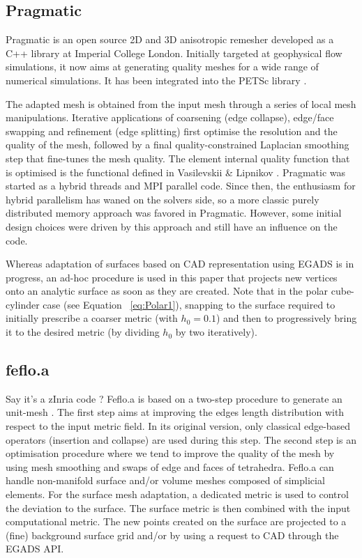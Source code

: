 \documentclass[3p,times,procedia,number]{elsarticle}
\begin{document}
\subsection{Pragmatic}

Pragmatic \cite{pragmatic-website,Gorman-2015} is an open source 2D and
3D anisotropic remesher developed as a C++ library at Imperial College
London.
Initially targeted at geophysical flow simulations, it now
aims at generating quality meshes for a wide range of numerical
simulations.
It has been integrated into the PETSc library \cite{petsc-user-ref,Barral-2016}.

The adapted mesh is obtained from the input mesh through a series of
local mesh manipulations. Iterative applications of coarsening (edge collapse),
edge/face swapping and refinement (edge splitting) first optimise the
resolution and the quality of the mesh, followed by a final
quality-constrained Laplacian smoothing step that fine-tunes the mesh
quality. The element internal quality function that is optimised is
the functional defined in Vasilevskii \& Lipnikov \cite{Vasilevskii-1999}.
Pragmatic was started as a hybrid threads and MPI parallel code. Since
then, the enthusiasm for hybrid parallelism has waned on the solvers side,
so a more classic purely distributed memory approach was favored in 
Pragmatic. However, some initial design 
choices were driven by this approach and still have an influence on the code. 

Whereas adaptation of surfaces based on CAD representation using EGADS
is in progress, an ad-hoc procedure is used in this paper that projects 
new vertices onto an analytic surface as soon as they are created.
Note that in the polar cube-cylinder case (see Equation ~\ref{eq:Polar1}), snapping 
to the surface required to initially prescribe a coarser metric (with $h_0 = 0.1$)
and then to progressively bring it to the desired metric (by dividing 
$h_0$ by two iteratively).


\subsection{feflo.a}

{\color{blue}Say it's a zInria code ?}
Feflo.a is based on a two-step procedure to generate an unit-mesh \cite{loseille-lohner-adapt-boom, loseille-handbook}.
The first step aims at improving the edges length distribution
with respect to the input metric field.
In its original version, only classical edge-based operators (insertion and collapse) are used during this step.
The second step is an optimisation procedure where we tend to improve the quality of the mesh by using mesh smoothing
and swaps of edge and faces of tetrahedra.
Feflo.a can handle non-manifold surface and/or volume meshes composed of simplicial elements.
For the surface mesh
adaptation, a dedicated metric is used to control the deviation to the surface.
The surface metric is then combined with the input computational metric.
The new points created on the surface are projected to a (fine) background surface grid and/or by using a request to CAD through the EGADS API.
\end{document}
